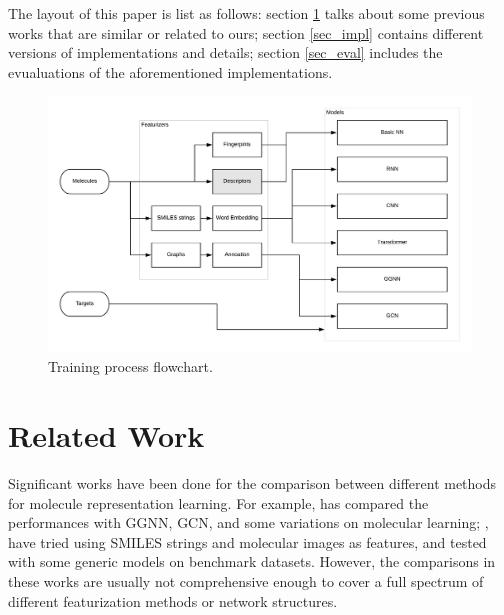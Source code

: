 \documentclass[conference]{IEEEtran}
\begin{document}
The layout of this paper is list as follows: 
section \ref{sec_rw} talks about some previous works that are similar or related to ours; 
section \ref{sec_impl} contains different versions of implementations and details; 
section \ref{sec_eval} includes the evualuations of the aforementioned implementations. 

\begin{figure}[!htb] 
	\includegraphics[width=\linewidth]{train.png}
	\caption{\small Training process flowchart. }
	\label{fig:train}
\end{figure}

\section{Related Work} \label{sec_rw}

Significant works have been done for the comparison between different methods for molecule representation learning. 
For example, \cite{gagcn} has compared the performances with GGNN, GCN, and some variations on molecular learning; \cite{smiles2vec}, \cite{chemception} have tried using SMILES strings and molecular images as features, and tested with some generic models on benchmark datasets. 
However, the comparisons in these works are usually not comprehensive enough to cover a full spectrum of different featurization methods or network structures. 
\end{document}

